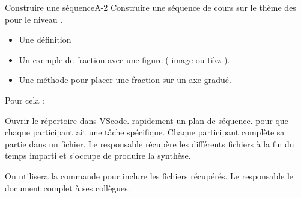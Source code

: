 \def\rdifficulty{2}
\begin{EXO}{Construire une séquence}{A-2}
    Construire une séquence de cours sur le thème des  pour le niveau .

    \begin{itemize}[label=$\bullet$]
        \item Une définition
        \item Un exemple de fraction avec une figure ( image ou tikz ).
        \item Une méthode pour placer une fraction sur un axe gradué. 
    \end{itemize}   

    Pour cela : 
    \begin{tcbenumerate}
        \tcbitem Ouvrir le répertoire  dans VScode.
        \tcbitem {} rapidement un plan de séquence.  pour que chaque participant ait une tâche spécifique.
        \tcbitem Chaque participant complète sa partie dans un fichier.
        \tcbitem Le responsable récupère les différents fichiers à la fin du temps imparti et s'occupe de produire la synthèse. 

        On utilisera la commande  pour inclure les fichiers récupérés. 
        \tcbitem Le responsable  le document complet à ses collègues.
    \end{tcbenumerate}
\end{EXO}